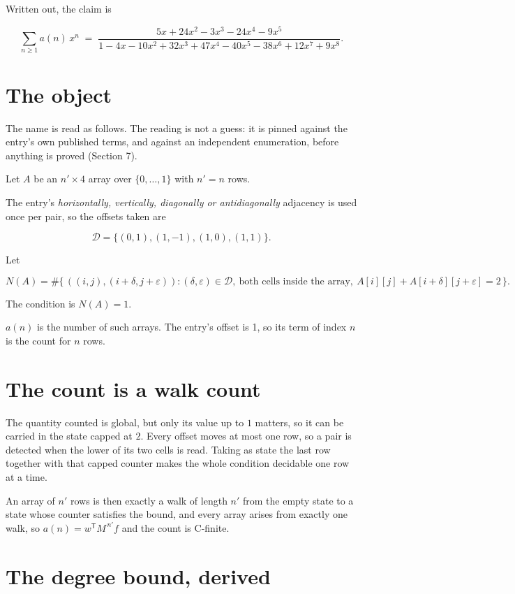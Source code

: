 \documentclass[11pt]{article}
\theoremstyle{definition}
\begin{document}
Written out, the claim is

\[\sum_{n \ge 1} a(n)\,x^n \;=\; \frac{5x + 24x^{2} - 3x^{3} - 24x^{4} - 9x^{5}}{1 - 4x - 10x^{2} + 32x^{3} + 47x^{4} - 40x^{5} - 38x^{6} + 12x^{7} + 9x^{8}}.\]

\section{The object}

The name is read as follows. The reading is not a guess: it is pinned against the entry's own published terms, and against an independent enumeration, before anything is proved (Section 7).

Let $A$ be an $n' \times 4$ array over $\{0,\dots,1\}$ with $n' = n$ rows.

The entry's {\itshape horizontally, vertically, diagonally or antidiagonally} adjacency is used once per pair, so the offsets taken are

\[\mathcal{D} = \{(0,1), (1,-1), (1,0), (1,1)\}.\]

Let

\[N(A) = \#\bigl\{\,((i,j),(i{+}\delta,j{+}\varepsilon)) : (\delta,\varepsilon) \in \mathcal{D},\ \text{both cells inside the array},\ A[i][j] + A[i{+}\delta][j{+}\varepsilon] = 2\,\bigr\}.\]

The condition is $N(A) = 1$.

$a(n)$ is the number of such arrays. The entry's offset is 1, so its term of index $n$ is the count for $n$ rows.

\section{The count is a walk count}

The quantity counted is global, but only its value up to $1$ matters, so it can be carried in the state capped at $2$. Every offset moves at most one row, so a pair is detected when the lower of its two cells is read. Taking as state the last row together with that capped counter makes the whole condition decidable one row at a time.

An array of $n'$ rows is then exactly a walk of length $n'$ from the empty state to a state whose counter satisfies the bound, and every array arises from exactly one walk, so $a(n) = w^{\mathsf T}M^{\,n'}f$ and the count is C-finite.

\section{The degree bound, derived}
\end{document}
